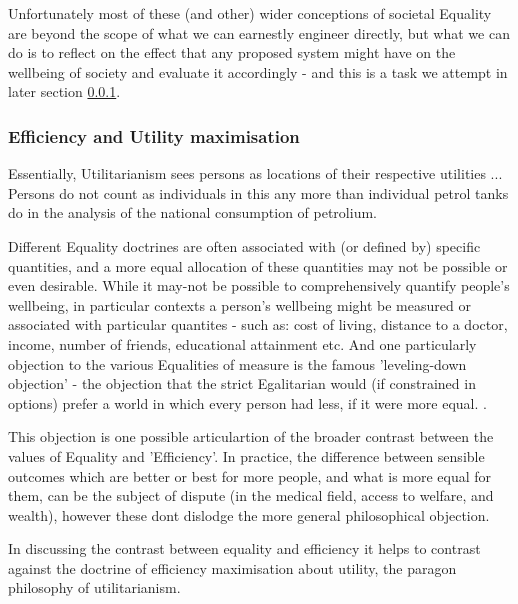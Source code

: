 Unfortunately most of these (and other) wider conceptions of societal Equality are beyond the scope of what we can earnestly engineer directly, but what we can do is to reflect on the effect that any proposed system might have on the wellbeing of society and evaluate it accordingly - and this is a task we attempt in later section \ref{}.

\subsubsection{Efficiency and Utility maximisation}

\begin{displayquote}
Essentially, Utilitarianism sees persons as locations of their respective utilities %
 ... Persons do not count as individuals in this any more than individual petrol tanks do in the analysis of the national consumption of petrolium.
\cite{}
\end{displayquote}

Different Equality doctrines are often associated with (or defined by) specific quantities, and a more equal allocation of these quantities may not be possible or even desirable.
While it may-not be possible to comprehensively quantify people's wellbeing, in particular contexts a person's wellbeing might be measured or associated with particular quantites - such as: cost of living, distance to a doctor, income, number of friends, educational attainment etc.
And one particularly objection to the various Equalities of measure is the famous 'leveling-down objection' - the objection that the strict Egalitarian would (if constrained in options) prefer a world in which every person had less, if it were more equal. \cite{temkin_2003, equalityandpriorityparfit}.

This objection is one possible articulartion of the broader contrast between the values of Equality and 'Efficiency'.
In practice, the difference between sensible outcomes which are better or best for more people, and what is more equal for them, can be the subject of dispute (in the medical field, access to welfare, and wealth), however these dont dislodge the more general philosophical objection.

In discussing the contrast between equality and efficiency it helps to contrast against the doctrine of efficiency maximisation about utility, the paragon philosophy of utilitarianism.

